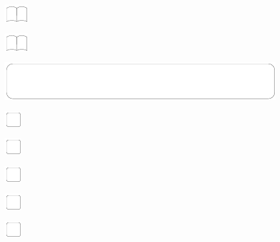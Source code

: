 \documentclass[11pt,titlepage]{article}
\begin{document}
\vspace{12mm}

\noindent
\includegraphics[]{book.pdf}

\vspace{12mm}

\noindent
\includegraphics[]{book.pdf}

\pagebreak

\small %
\hfill

\vspace{6mm}

\noindent
\includegraphics[]{mediumbox.pdf}

\vspace{15mm}

\noindent
\includegraphics[]{checkbox-4mm.pdf}

\vspace{10mm}

\noindent
\includegraphics[]{checkbox-4mm.pdf}

\vspace{10mm}

\noindent
\includegraphics[]{checkbox-4mm.pdf}

\vspace{10mm}

\noindent
\includegraphics[]{checkbox-4mm.pdf}

\vspace{10mm}

\noindent
\includegraphics[]{checkbox-4mm.pdf}
\end{document}
